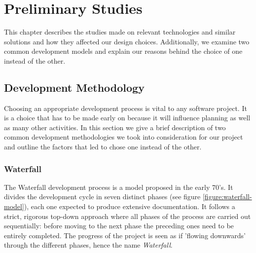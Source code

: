 
\chapter{Preliminary Studies}
\label{Preliminary Studies}

This chapter describes the studies made on relevant technologies and similar solutions and how they affected our design choices. 
Additionally, we examine two common development models and explain our reasons behind the choice of one instead of the other.


\section{Development Methodology}
\label{section:development-methodology}

Choosing an appropriate development process is vital to any software project.
It is a choice that has to be made early on because it will influence planning as well as many other activities. 
In this section we give a brief description of two common development methodologies we took into consideration
for our project and outline the factors that led to chose one instead of the other.

\subsection{Waterfall}

The Waterfall\cite{WaterfallModel} development process is a model proposed in the early 70's.
It divides the development cycle in seven distinct phases (see figure \ref{figure:waterfall-model}),
each one expected to produce extensive documentation.
It follows a strict, rigorous top-down approach where all phases of the process are carried out sequentially:
before moving to the next phase the preceding ones need to be entirely completed. The progress of the project
is seen as if 'flowing downwards' through the different phases, hence the name \textit{Waterfall}.

